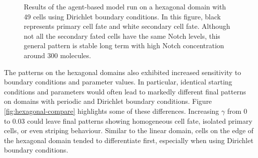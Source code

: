 \documentclass{article}
\begin{document}
\begin{figure}[!htp]
   \caption{Results of the agent-based model run on a hexagonal domain with 49 cells using Dirichlet boundary conditions. In this figure, black represents primary cell fate and white secondary cell fate. Although not all the secondary fated cells have the same Notch levels, this general pattern is stable long term with high Notch concentration around $300$ molecules.} 
   \label{fig:hexagonal-domain}
\end{figure}

The patterns on the hexagonal domains also exhibited increased sensitivity to boundary conditions and parameter values.
In particular, identical starting conditions and parameters would often lead to markedly different final patterns on domains with periodic and Dirichlet boundary conditions.
Figure \ref{fig:hexagonal-compare} highlights some of these differences.
Increasing $\gamma$ from $0$ to $0.03$ could leave final patterns showing homogeneous cell fate, isolated primary cells, or even striping behaviour.
Similar to the linear domain, cells on the edge of the hexagonal domain tended to differentiate first, especially when using Dirichlet boundary conditions.
\end{document}
